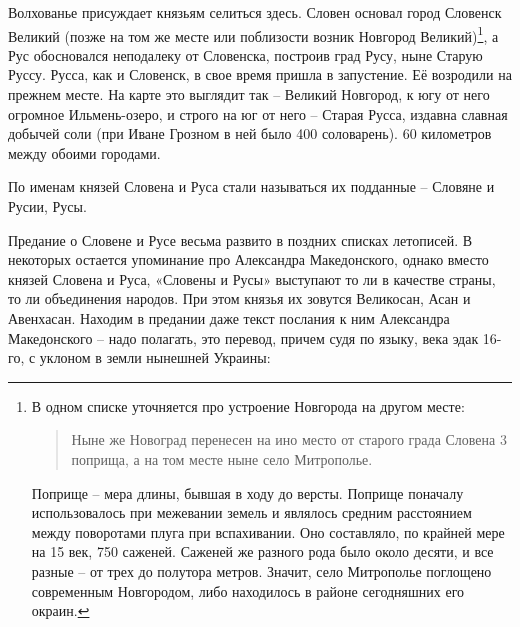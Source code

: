 Волхованье присуждает князьям селиться здесь. Словен основал город Словенск Великий (позже на том же месте или поблизости возник Новгород Великий)\footnote{В одном списке уточняется про устроение Новгорода на другом месте: 

\begin{quotation}
Ныне же Новоград перенесен на ино место от старого града Словена 3 поприща, а на том месте ныне село Митрополье.
\end{quotation}

Поприще – мера длины, бывшая в ходу до версты. Поприще поначалу использовалось при межевании земель и являлось средним расстоянием между поворотами плуга при вспахивании. Оно составляло, по крайней мере на 15 век, 750 саженей. Саженей же разного рода было около десяти, и все разные – от трех до полутора метров. Значит, село Митрополье поглощено современным Новгородом, либо находилось в районе сегодняшних его окраин.}, а Рус обосновался неподалеку от Словенска, построив град Русу, ныне Старую Руссу. Русса, как и Словенск, в свое время пришла в запустение. Её возродили на прежнем месте. На карте это выглядит так – Великий Новгород, к югу от него огромное Ильмень-озеро, и строго на юг от него – Старая Русса, издавна славная добычей соли (при Иване Грозном в ней было 400 соловарень). 60 километров между обоими городами.

По именам князей Словена и Руса стали называться их подданные – Словяне и Русии, Русы.

Предание о Словене и Русе весьма развито в поздних списках летописей. В некоторых остается упоминание про Александра Македонского, однако вместо князей Словена и Руса, «Словены и Русы» выступают то ли в качестве страны, то ли объединения народов. При этом князья их зовутся Великосан, Асан и Авенхасан. Находим в предании даже текст послания к ним Александра Македонского – надо полагать, это перевод, причем судя по языку, века эдак 16-го, с уклоном в земли нынешней Украины:


